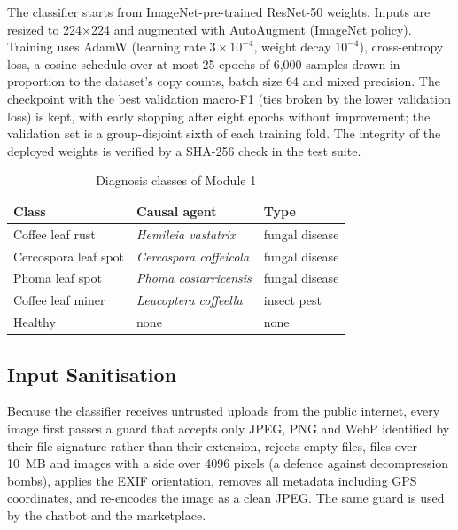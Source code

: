 The classifier starts from ImageNet-pre-trained ResNet-50 weights. Inputs are resized to
224$\times$224 and augmented with AutoAugment (ImageNet policy). Training uses AdamW (learning rate
$3\times10^{-4}$, weight decay $10^{-4}$), cross-entropy loss, a cosine schedule over at most 25 epochs of 6,000 samples
drawn in proportion to the dataset's copy counts, batch size 64 and mixed precision. The checkpoint with the best
validation macro-F1 (ties broken by the lower validation loss) is kept, with early stopping after eight epochs without
improvement; the validation set is a group-disjoint sixth of each training fold. The integrity of the deployed weights
is verified by a SHA-256 check in the test suite.

\begin{table}[t]
\caption{Diagnosis classes of Module 1}
\label{tab:classes}
\centering
\scriptsize
\begin{tabular}{@{}lll@{}}
\toprule
Class & Causal agent & Type \\
\midrule
Coffee leaf rust & \textit{Hemileia vastatrix} & fungal disease \\
Cercospora leaf spot & \textit{Cercospora coffeicola} & fungal disease \\
Phoma leaf spot & \textit{Phoma costarricensis} & fungal disease \\
Coffee leaf miner & \textit{Leucoptera coffeella} & insect pest \\
Healthy & none & none \\
\bottomrule
\end{tabular}
\end{table}

\subsection{Input Sanitisation}
Because the classifier receives untrusted uploads from the public internet, every image first passes a guard that
accepts only JPEG, PNG and WebP identified by their file signature rather than their extension, rejects empty files,
files over 10~MB and images with a side over 4096 pixels (a defence against decompression bombs), applies the EXIF
orientation, removes all metadata including GPS coordinates, and re-encodes the image as a clean JPEG. The same guard is
used by the chatbot and the marketplace.

